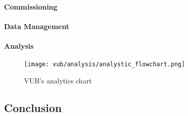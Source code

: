 \paragraph{Commissioning}

\paragraph{Data Management}

\paragraph{Analysis}
\begin{figure}[ht]
    \texttt{[image: vub/analysis/analystic\_flowchart.png]}
    \caption{\ac{VUB}'s analytics chart}
    \label{fig:vub_anal_chart}
\end{figure}


\subsection{Conclusion}
